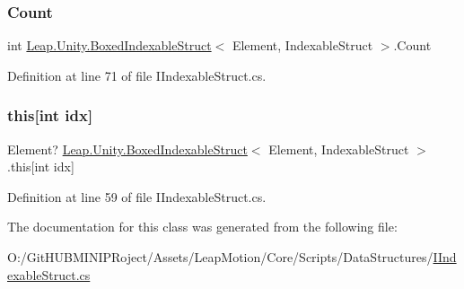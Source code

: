\subsubsection{\texorpdfstring{Count}{Count}}
{\footnotesize\ttfamily int \mbox{\hyperlink{class_leap_1_1_unity_1_1_boxed_indexable_struct}{Leap.\+Unity.\+Boxed\+Indexable\+Struct}}$<$ Element, Indexable\+Struct $>$.Count\hspace{0.3cm}{\ttfamily [get]}}



Definition at line 71 of file I\+Indexable\+Struct.\+cs.

\mbox{\label{class_leap_1_1_unity_1_1_boxed_indexable_struct_a36e9c859805dc125dbb8c0a37416a208}} 
\subsubsection{\texorpdfstring{this[int idx]}{this[int idx]}}
{\footnotesize\ttfamily Element? \mbox{\hyperlink{class_leap_1_1_unity_1_1_boxed_indexable_struct}{Leap.\+Unity.\+Boxed\+Indexable\+Struct}}$<$ Element, Indexable\+Struct $>$.this\mbox{[}int idx\mbox{]}\hspace{0.3cm}{\ttfamily [get]}}



Definition at line 59 of file I\+Indexable\+Struct.\+cs.



The documentation for this class was generated from the following file\+:\begin{DoxyCompactItemize}
\item 
O\+:/\+Git\+H\+U\+B\+M\+I\+N\+I\+P\+Roject/\+Assets/\+Leap\+Motion/\+Core/\+Scripts/\+Data\+Structures/\mbox{\hyperlink{_i_indexable_struct_8cs}{I\+Indexable\+Struct.\+cs}}\end{DoxyCompactItemize}
